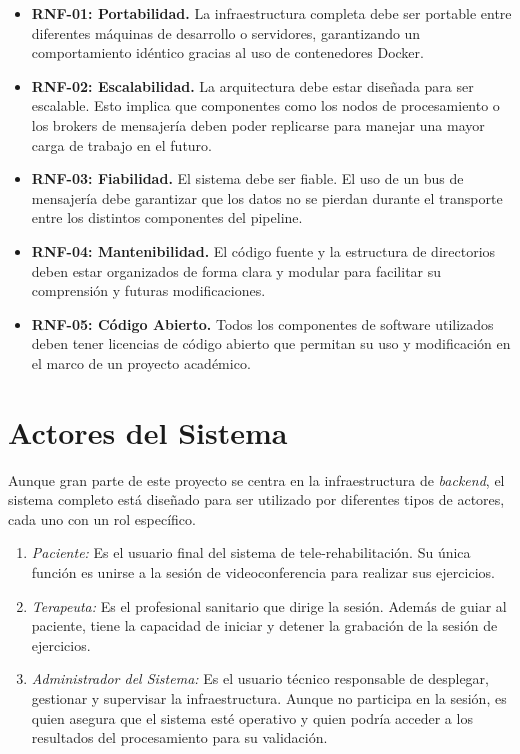 \begin{itemize}
    \item \textbf{RNF-01: Portabilidad.} La infraestructura completa debe ser portable entre diferentes máquinas de desarrollo o servidores, garantizando un comportamiento idéntico gracias al uso de contenedores Docker.
    
    \item \textbf{RNF-02: Escalabilidad.} La arquitectura debe estar diseñada para ser escalable. Esto implica que componentes como los nodos de procesamiento o los brokers de mensajería deben poder replicarse para manejar una mayor carga de trabajo en el futuro.
    
    \item \textbf{RNF-03: Fiabilidad.} El sistema debe ser fiable. El uso de un bus de mensajería debe garantizar que los datos no se pierdan durante el transporte entre los distintos componentes del pipeline.
    
    \item \textbf{RNF-04: Mantenibilidad.} El código fuente y la estructura de directorios deben estar organizados de forma clara y modular para facilitar su comprensión y futuras modificaciones.
    
    \item \textbf{RNF-05: Código Abierto.} Todos los componentes de software utilizados deben tener licencias de código abierto que permitan su uso y modificación en el marco de un proyecto académico.
\end{itemize}

\section{Actores del Sistema}
\label{sec:actores}
Aunque gran parte de este proyecto se centra en la infraestructura de \textit{backend}, el sistema completo está diseñado para ser utilizado por diferentes tipos de actores, cada uno con un rol específico.

\begin{enumerate}
    \item \emph{Paciente:} Es el usuario final del sistema de tele-rehabilitación. Su única función es unirse a la sesión de videoconferencia para realizar sus ejercicios.
    \item \emph{Terapeuta:} Es el profesional sanitario que dirige la sesión. Además de guiar al paciente, tiene la capacidad de iniciar y detener la grabación de la sesión de ejercicios.
    \item \emph{Administrador del Sistema:} Es el usuario técnico responsable de desplegar, gestionar y supervisar la infraestructura. Aunque no participa en la sesión, es quien asegura que el sistema esté operativo y quien podría acceder a los resultados del procesamiento para su validación.
\end{enumerate}

